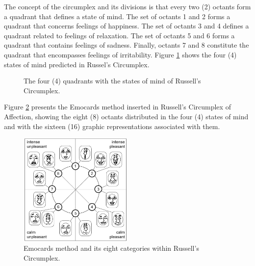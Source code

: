 The concept of the circumplex and its divisions is that every two (2) octants form a quadrant that defines a state of mind.
The set of octants 1 and 2 forms a quadrant that concerns feelings of happiness.
The set of octants 3 and 4 defines a quadrant related to feelings of relaxation.
The set of octants 5 and 6 forms a quadrant that contains feelings of sadness.
Finally, octants 7 and 8 constitute the quadrant that encompasses feelings of irritability.
Figure \ref{fig:Octantes} shows the four (4) states of mind predicted in Russel's Circumplex.

\begin{figure}[!htb]
        \centering
        \caption{The four (4) quadrants with the states of mind of Russell's Circumplex.}
        \label{fig:Octantes}
        
\end{figure}

Figure \ref{fig:EmocardsMethod} presents the Emocards method inserted in Russell's Circumplex of Affection, showing the eight (8) octants distributed in the four (4) states of mind and with the sixteen (16) graphic representations associated with them.

\begin{figure}[!htb]
        \centering
        \caption{Emocards method and its eight categories within Russell's Circumplex.}
        \label{fig:EmocardsMethod}
        \includegraphics[width=0.5\textwidth]{img/Emocards.png}
\end{figure}


